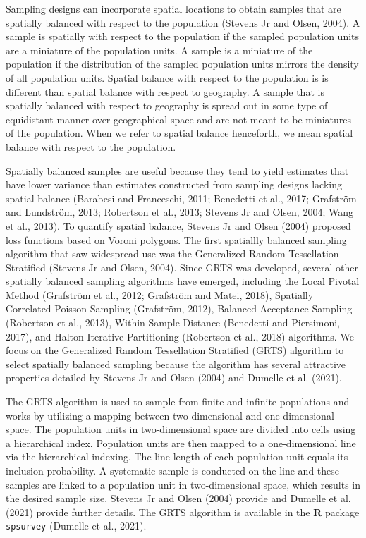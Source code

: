 \documentclass[]{elsarticle} %
\begin{document}
Sampling designs can incorporate spatial locations to obtain samples
that are spatially balanced with respect to the population (Stevens Jr
and Olsen, 2004). A sample is spatially with respect to the population
if the sampled population units are a miniature of the population units.
A sample is a miniature of the population if the distribution of the
sampled population units mirrors the density of all population units.
Spatial balance with respect to the population is is different than
spatial balance with respect to geography. A sample that is spatially
balanced with respect to geography is spread out in some type of
equidistant manner over geographical space and are not meant to be
miniatures of the population. When we refer to spatial balance
henceforth, we mean spatial balance with respect to the population.

Spatially balanced samples are useful because they tend to yield
estimates that have lower variance than estimates constructed from
sampling designs lacking spatial balance (Barabesi and Franceschi, 2011;
Benedetti et al., 2017; Grafström and Lundström, 2013; Robertson et al.,
2013; Stevens Jr and Olsen, 2004; Wang et al., 2013). To quantify
spatial balance, Stevens Jr and Olsen (2004) proposed loss functions
based on Voroni polygons. The first spatiallly balanced sampling
algorithm that saw widespread use was the Generalized Random
Tessellation Stratified (Stevens Jr and Olsen, 2004). Since GRTS was
developed, several other spatially balanced sampling algorithms have
emerged, including the Local Pivotal Method (Grafström et al., 2012;
Grafström and Matei, 2018), Spatially Correlated Poisson Sampling
(Grafström, 2012), Balanced Acceptance Sampling (Robertson et al.,
2013), Within-Sample-Distance (Benedetti and Piersimoni, 2017), and
Halton Iterative Partitioning (Robertson et al., 2018) algorithms. We
focus on the Generalized Random Tessellation Stratified (GRTS) algorithm
to select spatially balanced sampling because the algorithm has several
attractive properties detailed by Stevens Jr and Olsen (2004) and
Dumelle et al. (2021).

The GRTS algorithm is used to sample from finite and infinite
populations and works by utilizing a mapping between two-dimensional and
one-dimensional space. The population units in two-dimensional space are
divided into cells using a hierarchical index. Population units are then
mapped to a one-dimensional line via the hierarchical indexing. The line
length of each population unit equals its inclusion probability. A
systematic sample is conducted on the line and these samples are linked
to a population unit in two-dimensional space, which results in the
desired sample size. Stevens Jr and Olsen (2004) provide and Dumelle et
al. (2021) provide further details. The GRTS algorithm is available in
the \textbf{\textsf{R}} package \texttt{spsurvey} (Dumelle et al.,
2021).
\end{document}
